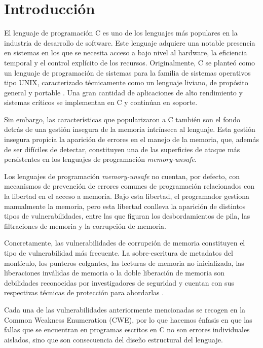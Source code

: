 \documentclass[12pt, a4paper, twoside]{article}
\begin{document}
\tableofcontents	

\listoffigures

\listoftables

\section{Introducción}
El lenguaje de programación C es uno de los lenguajes más populares en la industria de desarrollo de software. Este lenguaje adquiere una notable presencia en sistemas en los que se necesita acceso a bajo nivel al hardware, la eficiencia temporal y el control explícito de los recursos. Originalmente, C se planteó como un lenguaje de programación de sistemas para la familia de sistemas operativos tipo UNIX,  caracterizado técnicamente como un lenguaje liviano, de propósito general y portable \cite{seacord-2013}. Una gran cantidad de aplicaciones de alto rendimiento y sistemas críticos se implementan en C y continúan en soporte.

Sin embargo, las características que popularizaron a C también son el fondo detrás de una gestión insegura de la memoria intrínseca al lenguaje. Esta gestión insegura propicia la aparición de errores en el manejo de la memoria, que, además de ser difíciles de detectar, constituyen una de las superficies de ataque más persistentes en los lenguajes de programación \textit{memory-unsafe}.

Los lenguajes de programación \textit{memory-unsafe} no cuentan, por defecto, con mecanismos de prevención de errores comunes de programación relacionados con la libertad en el acceso a memoria. Bajo esta libertad, el programador gestiona manualmente la memoria, pero esta libertad conlleva la aparición de distintos tipos de vulnerabilidades, entre las que figuran los desbordamientos de pila, las filtraciones de memoria y la corrupción de memoria.

Concretamente, las vulnerabilidades de corrupción de memoria constituyen el tipo de vulnerabilidad más frecuente. La sobre-escritura de metadatos del montículo, los punteros colgantes, las lecturas de memoria no inicializada, las liberaciones inválidas de memoria o la doble liberación de memoria son debilidades reconocidas por investigadores de seguridad y cuentan con sus respectivas técnicas de protección para abordarlas \cite{moghadam-2024}.

Cada una de las vulnerabilidades anteriormente mencionadas se recogen en la Common Weakness Enumeration (CWE), por lo que hacemos énfasis en que las fallas que se encuentran en programas escritos en C no son errores individuales aislados, sino que son consecuencia del diseño estructural del lenguaje.
\end{document}
